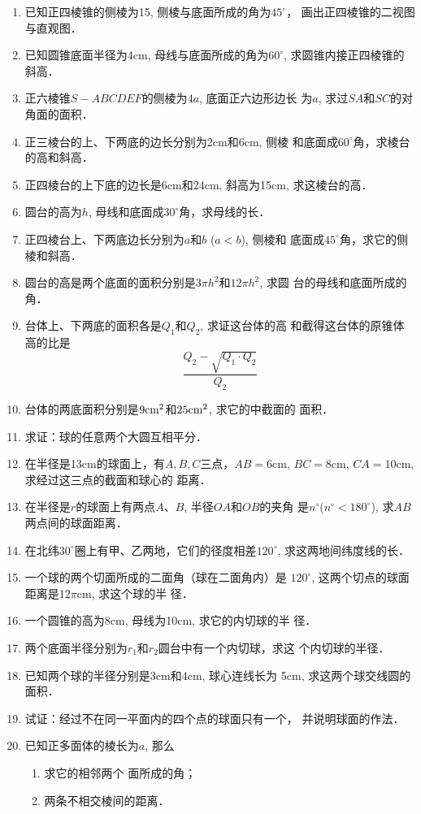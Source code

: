 \begin{enumerate}
\item 已知正四棱锥的侧棱为15, 侧棱与底面所成的角为$45^{\circ}$，
画出正四棱锥的二视图与直观图．
\item 已知圆锥底面半径为4cm, 母线与底面所成的角为$60^{\circ}$,
求圆锥内接正四棱锥的斜高．
\item 正六棱锥$S-ABCDEF$的侧棱为$4a$, 底面正六边形边长
为$a$, 求过$SA$和$SC$的对角面的面积．
\item 正三棱台的上、下两底的边长分别为2cm和6cm, 侧棱
和底面成$60^{\circ}$角，求棱台的高和斜高．
\item 正四棱台的上下底的边长是6cm和24cm, 斜高为15cm, 
求这棱台的高．
\item 圆台的高为$h$, 母线和底面成$30^{\circ}$角，求母线的长．
\item 正四棱台上、下两底边长分别为$a$和$b$ ($a<b$), 侧棱和
底面成$45^{\circ}$角，求它的侧棱和斜高．
\item 圆台的高是两个底面的面积分别是$3\pi h^2$和$12\pi h^2$, 求圆
台的母线和底面所成的角．
\item 台体上、下两底的面积各是$Q_1$和$Q_2$, 求证这台体的高
和截得这台体的原锥体高的比是
\[\frac{Q_2-\sqrt{Q_1\cdot Q_2}}{Q_2}\]
\item 台体的两底面积分别是$9{\rm cm^2}$和$25{\rm cm^2}$, 求它的中截面的
面积．
\item 求证：球的任意两个大圆互相平分．
\item 在半径是13cm的球面上，有$A,B,C$三点，$AB=6$cm, 
$BC=8$cm, $CA=10$cm, 求经过这三点的截面和球心的
距离．
\item 在半径是$r$的球面上有两点$A$、$B$, 半径$OA$和$OB$的夹角
是$n^{\circ}$($n^{\circ}<180^{\circ}$), 求$AB$两点间的球面距离．
\item 在北纬$30^{\circ}$圈上有甲、乙两地，它们的径度相差$120^{\circ}$,
求这两地间纬度线的长．
\item 一个球的两个切面所成的二面角（球在二面角内）是
$120^{\circ}$, 这两个切点的球面距离是$12\pi$cm, 求这个球的半
径．
\item 一个圆锥的高为8cm, 母线为10cm, 求它的内切球的半
径．
\item 两个底面半径分别为$r_1$和$r_2$圆台中有一个内切球，求这
个内切球的半径．
\item 已知两个球的半径分别是3cm和4cm, 球心连线长为
5cm, 求这两个球交线圆的面积．
\item 试证：经过不在同一平面内的四个点的球面只有一个，
并说明球面的作法．
\item 已知正多面体的棱长为$a$, 那么
\begin{enumerate}
\item 求它的相邻两个
面所成的角；
\item 两条不相交棱间的距离．
\end{enumerate}


\end{enumerate}
